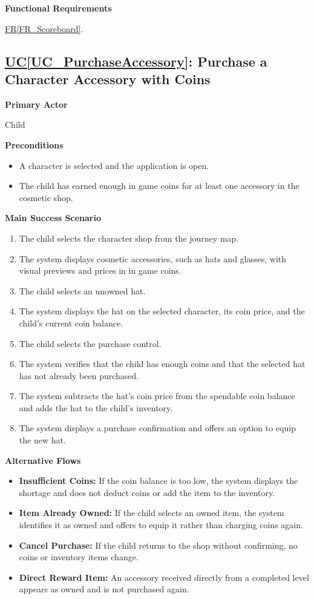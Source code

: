 \documentclass[12pt]{article}
\newcounter{ucnum} %
\newcommand{\ucref}[1]{\hyperref[#1]{UC\ref*{#1}}}
\newcommand{\rref}[1]{\hyperref[#1]{FR\ref*{#1}}}
\begin{document}
\textbf{Functional Requirements}

\rref{FR_Scoreboard}.

\label{UC_PurchaseAccessory}
\subsection{\ucref{UC_PurchaseAccessory}: Purchase a Character Accessory with Coins}

\textbf{Primary Actor}

Child

\textbf{Preconditions}
\begin{itemize}
    \item A character is selected and the application is open.
    \item The child has earned enough in game coins for at least
    one accessory in the cosmetic shop.
\end{itemize}

\textbf{Main Success Scenario}
\begin{enumerate}
    \item The child selects the character shop from the journey map.
    \item The system displays cosmetic accessories, such as hats
    and glasses, with visual previews and prices in in game coins.
    \item The child selects an unowned hat.
    \item The system displays the hat on the selected character,
    its coin price, and the child's current coin balance.
    \item The child selects the purchase control.
    \item The system verifies that the child has enough coins and
    that the selected hat has not already been purchased.
    \item The system subtracts the hat's coin price from the
    spendable coin balance and adds the hat to the child's inventory.
    \item The system displays a purchase confirmation and offers
    an option to equip the new hat.
\end{enumerate}

\textbf{Alternative Flows}
\begin{itemize}
    \item \textbf{Insufficient Coins:} If the coin balance is too low,
    the system displays the shortage and does not deduct coins
    or add the item to the inventory.
    \item \textbf{Item Already Owned:} If the child selects an owned
    item, the system identifies it as owned and offers to equip
    it rather than charging coins again.
    \item \textbf{Cancel Purchase:} If the child returns to the shop
    without confirming, no coins or inventory items change.
    \item \textbf{Direct Reward Item:} An accessory received directly
    from a completed level appears as owned and is not purchased again.
\end{itemize}
\end{document}
